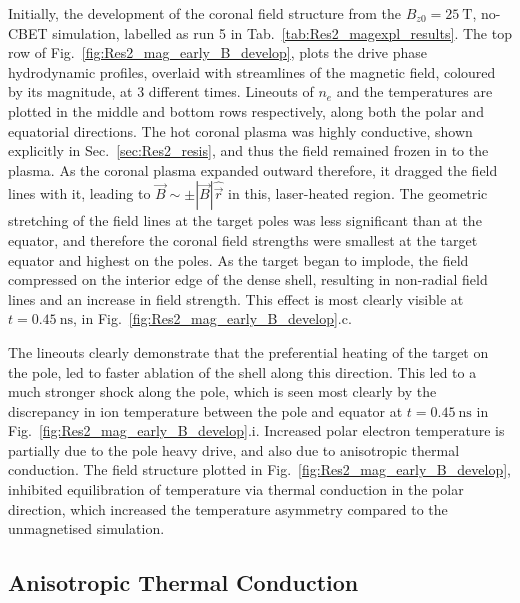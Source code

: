 Initially, the development of the coronal field structure from the $B_{z0}=25\ \text{T}$, no-\ac{CBET} simulation, labelled as run 5 in Tab.~\ref{tab:Res2_magexpl_results}.
The top row of Fig.~\ref{fig:Res2_mag_early_B_develop}, plots the drive phase hydrodynamic profiles, overlaid with streamlines of the magnetic field, coloured by its magnitude, at 3 different times.
Lineouts of $n_e$ and the temperatures are plotted in the middle and bottom rows respectively, along both the polar and equatorial directions.
The hot coronal plasma was highly conductive, shown explicitly in Sec.~\ref{sec:Res2_resis}, and thus the field remained frozen in to the plasma.
As the coronal plasma expanded outward therefore, it dragged the field lines with it, leading to $\vec{B}\sim\pm|\vec{B}|\hat{\vec{r}}$ in this, laser-heated region.
The geometric stretching of the field lines at the target poles was less significant than at the equator, and therefore the coronal field strengths were smallest at the target equator and highest on the poles.
As the target began to implode, the field compressed on the interior edge of the dense shell, resulting in non-radial field lines and an increase in field strength.
This effect is most clearly visible at $t=0.45\ \text{ns}$, in Fig.~\ref{fig:Res2_mag_early_B_develop}.c.

The lineouts clearly demonstrate that the preferential heating of the target on the pole, led to faster ablation of the shell along this direction.
This led to a much stronger shock along the pole, which is seen most clearly by the discrepancy in ion temperature between the pole and equator at $t=0.45\ \text{ns}$ in Fig.~\ref{fig:Res2_mag_early_B_develop}.i.
Increased polar electron temperature is partially due to the pole heavy drive, and also due to anisotropic thermal conduction.
The field structure plotted in Fig.~\ref{fig:Res2_mag_early_B_develop}, inhibited equilibration of temperature via thermal conduction in the polar direction, which increased the temperature asymmetry compared to the unmagnetised simulation.


\subsection{Anisotropic Thermal Conduction}%
\label{sec:Res2_aniso}

